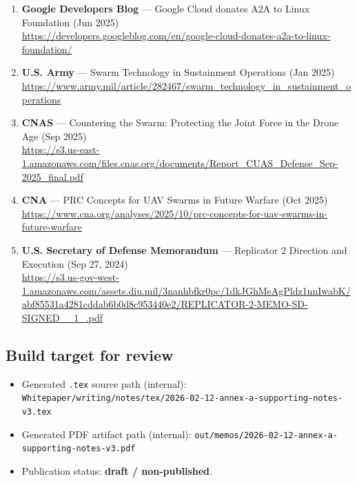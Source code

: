 \documentclass[
]{article}
\providecommand{\tightlist}{%
  \setlength{\itemsep}{0pt}\setlength{\parskip}{0pt}}
\begin{document}
\begin{enumerate}
  an upgrade (Jul 2025)\\
  \url{https://cloud.google.com/blog/products/ai-machine-learning/agent2agent-protocol-is-getting-an-upgrade}
\item
  \textbf{Google Developers Blog} --- Google Cloud donates A2A to Linux
  Foundation (Jun 2025)\\
  \url{https://developers.googleblog.com/en/google-cloud-donates-a2a-to-linux-foundation/}
\item
  \textbf{U.S. Army} --- Swarm Technology in Sustainment Operations (Jan
  2025)\\
  \url{https://www.army.mil/article/282467/swarm_technology_in_sustainment_operations}
\item
  \textbf{CNAS} --- Countering the Swarm: Protecting the Joint Force in
  the Drone Age (Sep 2025)\\
  \url{https://s3.us-east-1.amazonaws.com/files.cnas.org/documents/Report_CUAS_Defense_Sep-2025_final.pdf}
\item
  \textbf{CNA} --- PRC Concepts for UAV Swarms in Future Warfare (Oct
  2025)\\
  \url{https://www.cna.org/analyses/2025/10/prc-concepts-for-uav-swarms-in-future-warfare}
\item
  \textbf{U.S. Secretary of Defense Memorandum} --- Replicator 2
  Direction and Execution (Sep 27, 2024)\\
  \url{https://s3.us-gov-west-1.amazonaws.com/assets.diu.mil/3nanhbfkr0pc/1dkJGhMeAgPldz1nnIwabK/abf85531a4281cddab6b0d8c953440e2/REPLICATOR-2-MEMO-SD-SIGNED__1_.pdf}
\end{enumerate}

\hypertarget{build-target-for-review}{%
\subsection{Build target for review}\label{build-target-for-review}}

\begin{itemize}
\tightlist
\item
  Generated \texttt{.tex} source path (internal):
  \texttt{Whitepaper/writing/notes/tex/2026-02-12-annex-a-supporting-notes-v3.tex}
\item
  Generated PDF artifact path (internal):
  \texttt{out/memos/2026-02-12-annex-a-supporting-notes-v3.pdf}
\item
  Publication status: \textbf{draft / non-published}.
\end{itemize}
\end{document}
